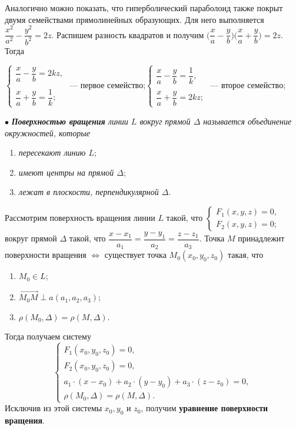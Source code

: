 Аналогично можно показать, что гиперболический параболоид также покрыт двумя семействами прямолинейных образующих. Для него выполняется $\dfrac{x^2}{a^2} - \dfrac{y^2}{b^2} = 2z$. Распишем разность квадратов и получим $\Big(\dfrac{x}{a}-\dfrac{y}{b}\Big)\Big(\dfrac{x}{a}+\dfrac{y}{b}\Big) = 2z$. Тогда\begin{center}
	$\begin{cases}
		\dfrac{x}{a} - \dfrac{y}{b} = 2kz,\\\\
		\dfrac{x}{a} + \dfrac{y}{b} = \dfrac{1}{k};
	\end{cases}$ --- первое семейство;\quad $\begin{cases}
		\dfrac{x}{a} - \dfrac{y}{b} = \dfrac{1}{k},\\\\
		\dfrac{x}{a} + \dfrac{y}{b} = 2kz;
	\end{cases}$ --- второе семейство;
\end{center}
$\bullet$ \textit{\textbf{Поверхностью вращения} линии $L$ вокруг прямой $\Delta$ называется объединение окружностей, которые}\begin{enumerate}
	\item \textit{пересекают линию $L$};
	\item \textit{имеют центры на прямой $\Delta$};
	\item \textit{лежат в плоскости, перпендикулярной $\Delta$}.
\end{enumerate}
Рассмотрим поверхность вращения линии $L$  такой, что $\begin{cases}
	F_1(x,y,z) = 0,\\
	F_2(x,y,z) = 0;
\end{cases}$ вокруг прямой $\Delta$ такой, что $\dfrac{x-x_1}{a_1} = \dfrac{y-y_1}{a_2} = \dfrac{z-z_1}{a_3}.$ Точка $M$ принадлежит поверхности вращения $\Longleftrightarrow$ существует точка $M_0(x_0, y_0, z_0)$ такая, что\begin{enumerate}
	\item $M_0\in L$;
	\item $\overrightarrow{M_0M}\perp a(a_1, a_2, a_3)$;
	\item $\rho(M_0, \Delta) = \rho (M,\Delta)$.
\end{enumerate} Тогда получаем систему $$\begin{cases}
	F_1(x_0,y_0,z_0) = 0,\\
	F_2(x_0,y_0,z_0) = 0,\\
	a_1\cdot(x-x_0) + a_2\cdot(y-y_0) + a_3\cdot (z-z_0) = 0,\\
	\rho(M_0, \Delta) = \rho (M,\Delta).
\end{cases}$$ Исключив из этой системы $x_0, y_0$ и $z_0$, получим \textbf{уравнение поверхности вращения}.